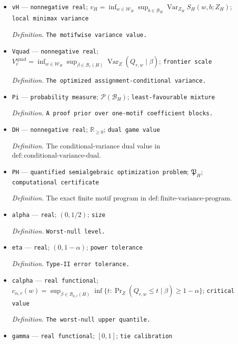 \documentclass{article}
\begin{document}
\begin{itemize}
  \item \texttt{vH} --- \texttt{nonnegative real}; \(v_H=\inf_{w\in\mathcal W_H}\sup_{b\in\mathcal B_H}\operatorname{Var}_{Z_H}S_H(w,b;Z_H)\); \texttt{local minimax variance}
  \par\smallskip\noindent\emph{Definition.} \texttt{The motifwise variance value.}
  \item \texttt{Vquad} --- \texttt{nonnegative real}; \(V^{\mathrm{quad}}_r=\inf_{w\in\mathcal W_H}\sup_{\beta\in\mathcal B_r(H)}\operatorname{Var}_Z(Q_{r,w}\mid\beta)\); \texttt{frontier scale}
  \par\smallskip\noindent\emph{Definition.} \texttt{The optimized assignment-\allowbreak{}conditional variance.}
  \item \texttt{Pi} --- \texttt{probability measure}; \(\mathcal P(\mathcal B_H)\); \texttt{least-\allowbreak{}favourable mixture}
  \par\smallskip\noindent\emph{Definition.} \texttt{A proof prior over one-\allowbreak{}motif coefficient blocks.}
  \item \texttt{DH} --- \texttt{nonnegative real}; \(\mathbb R_{\ge0}\); \texttt{dual game value}
  \par\smallskip\noindent\emph{Definition.} The conditional-variance dual value in \(\mathrm{def:conditional\text{-}variance\text{-}dual}\).
  \item \texttt{PH} --- \texttt{quantified semialgebraic optimization problem}; \(\mathfrak P_H\); \texttt{computational certificate}
  \par\smallskip\noindent\emph{Definition.} The exact finite motif program in \(\mathrm{def:finite\text{-}variance\text{-}program}\).
  \item \texttt{alpha} --- \texttt{real}; \((0,1/2)\); \texttt{size}
  \par\smallskip\noindent\emph{Definition.} \texttt{Worst-\allowbreak{}null level.}
  \item \texttt{eta} --- \texttt{real}; \((0,1-\alpha)\); \texttt{power tolerance}
  \par\smallskip\noindent\emph{Definition.} \texttt{Type-\allowbreak{}II error tolerance.}
  \item \texttt{calpha} --- \texttt{real functional}; \(c_{\alpha,r}(w)=\sup_{\beta\in\mathcal B_{0,r}(H)}\inf\{t:\Pr_Z(Q_{r,w}\le t\mid\beta)\ge1-\alpha\}\); \texttt{critical value}
  \par\smallskip\noindent\emph{Definition.} \texttt{The worst-\allowbreak{}null upper quantile.}
  \item \texttt{gamma} --- \texttt{real functional}; \([0,1]\); \texttt{tie calibration}

\end{itemize}
\end{document}
